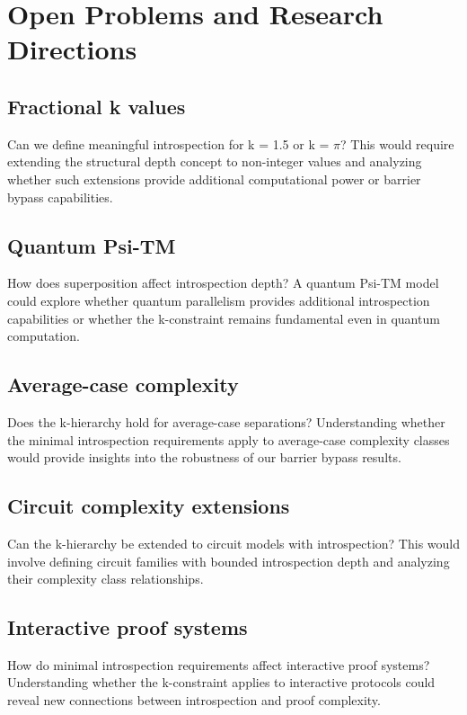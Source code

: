 \documentclass[11pt]{article}
\theoremstyle{plain}
\theoremstyle{definition}
\begin{document}


\section{Open Problems and Research Directions}

\subsection{Fractional k values}
Can we define meaningful introspection for k = 1.5 or k = $\pi$? This would require extending the structural depth concept to non-integer values and analyzing whether such extensions provide additional computational power or barrier bypass capabilities.

\subsection{Quantum Psi-TM}
How does superposition affect introspection depth? A quantum Psi-TM model could explore whether quantum parallelism provides additional introspection capabilities or whether the k-constraint remains fundamental even in quantum computation.

\subsection{Average-case complexity}
Does the k-hierarchy hold for average-case separations? Understanding whether the minimal introspection requirements apply to average-case complexity classes would provide insights into the robustness of our barrier bypass results.

\subsection{Circuit complexity extensions}
Can the k-hierarchy be extended to circuit models with introspection? This would involve defining circuit families with bounded introspection depth and analyzing their complexity class relationships.

\subsection{Interactive proof systems}
How do minimal introspection requirements affect interactive proof systems? Understanding whether the k-constraint applies to interactive protocols could reveal new connections between introspection and proof complexity.
\end{document}
